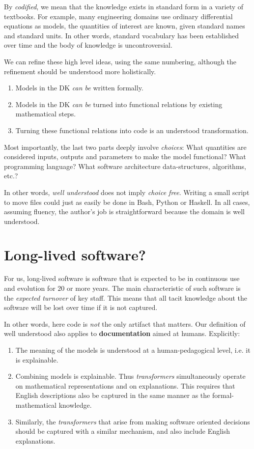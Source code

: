 \documentclass[sigconf,review]{acmart}
\begin{document}
By \emph{codified}, we mean that the knowledge exists in standard form in a
variety of textbooks. For example, many engineering domains use
ordinary differential equations as models, the quantities of
interest are known, given standard names and standard units. In other words,
standard vocabulary has been established over time and the body of knowledge is
uncontroversial.

We can refine these high level ideas, using the same numbering,
although the refinement should be
understood more holistically.
\begin{enumerate}
\item Models in the DK \emph{can be} written formally.
\item Models in the DK \emph{can be} turned into functional relations by
 existing mathematical steps.
\item Turning these functional relations into code is an understood
 transformation.
\end{enumerate}
Most importantly, the last two parts
deeply involve \emph{choices}: What quantities are considered inputs, outputs
and parameters to make the model functional? What programming language?  What
software architecture data-structures, algorithms, etc.?

In other words,
\emph{well understood} does not imply \emph{choice free}.  Writing a small 
script to move files could just as easily be done in Bash, Python or Haskell.
In all cases, assuming fluency, the author's job is straightforward because
the domain is well understood.

\section{Long-lived software?}
For us, long-lived software is software that is expected to be in continuous
use and evolution for $20$ or more years. The main characteristic of
such software is the \emph{expected turnover} of key staff. This means that
all tacit knowledge about the software will be lost over time if it is not
captured.

In other words, here code is \emph{not} the only artifact that matters.  
Our definition of well understood also applies to 
\textbf{documentation} aimed at humans.
Explicitly:
\begin{enumerate}
\item The meaning of the models is understood at a human-pedagogical
level, i.e. it is explainable.
\item Combining models is explainable. Thus \emph{transformers}
  simultaneously operate on mathematical representations
and on explanations. This requires that English descriptions also be
captured in the same manner as the formal-mathematical knowledge.
\item Similarly, the \emph{transformers} that arise from making software
oriented decisions should be captured with a similar mechanism, and also include
English explanations.
\end{enumerate}
\end{document}
